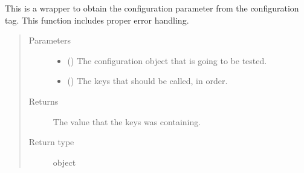 \documentclass[letterpaper,10pt,english]{sphinxmanual}
\begin{document}

\begin{fulllineitems}
\label{\detokenize{docstrings/ifa_smeargle.core.configuration:ifa_smeargle.core.configuration.extract_configuration}}
This is a wrapper to obtain the configuration parameter from
the configuration tag. This function includes proper error
handling.
\begin{quote}\begin{description}
\item[{Parameters}] \leavevmode\begin{itemize}
\item {} 
 () \textendash{} The configuration object that is going to be tested.

\item {} 
 () \textendash{} The keys that should be called, in order.

\end{itemize}

\item[{Returns}] \leavevmode
{} \textendash{} The value that the keys was containing.

\item[{Return type}] \leavevmode
object

\end{description}\end{quote}

\end{fulllineitems}

\end{document}
